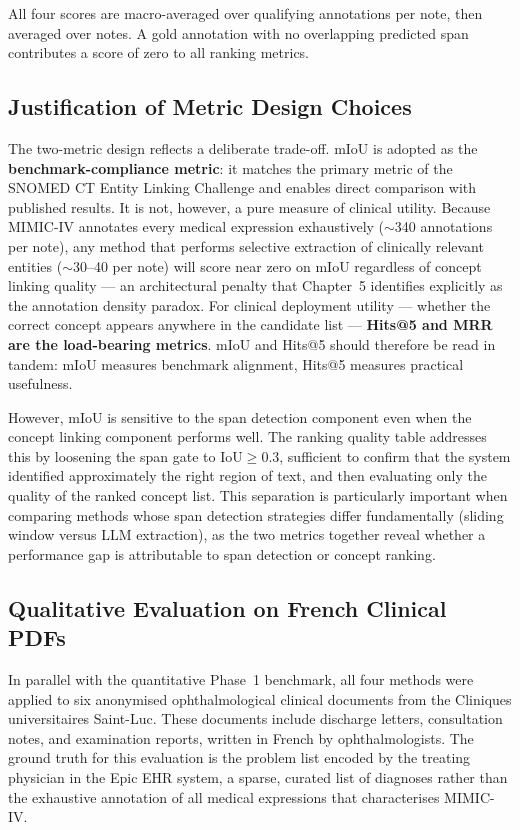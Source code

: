 All four scores are macro-averaged over qualifying annotations per note, then averaged over notes. A gold annotation with no overlapping predicted span contributes a score of zero to all ranking metrics.

\subsection{Justification of Metric Design Choices}

The two-metric design reflects a deliberate trade-off. mIoU is adopted as the \textbf{benchmark-compliance metric}: it matches the primary metric of the SNOMED CT Entity Linking Challenge and enables direct comparison with published results. It is not, however, a pure measure of clinical utility. Because MIMIC-IV annotates every medical expression exhaustively ($\sim$340 annotations per note), any method that performs selective extraction of clinically relevant entities ($\sim$30--40 per note) will score near zero on mIoU regardless of concept linking quality — an architectural penalty that Chapter~5 identifies explicitly as the annotation density paradox. For clinical deployment utility — whether the correct concept appears anywhere in the candidate list — \textbf{Hits@5 and MRR are the load-bearing metrics}. mIoU and Hits@5 should therefore be read in tandem: mIoU measures benchmark alignment, Hits@5 measures practical usefulness.

However, mIoU is sensitive to the span detection component even when the concept linking component performs well. The ranking quality table addresses this by loosening the span gate to $\text{IoU} \geq 0.3$, sufficient to confirm that the system identified approximately the right region of text, and then evaluating only the quality of the ranked concept list. This separation is particularly important when comparing methods whose span detection strategies differ fundamentally (sliding window versus LLM extraction), as the two metrics together reveal whether a performance gap is attributable to span detection or concept ranking.

\subsection{Qualitative Evaluation on French Clinical PDFs}

In parallel with the quantitative Phase~1 benchmark, all four methods were applied to six anonymised ophthalmological clinical documents from the Cliniques universitaires Saint-Luc. These documents include discharge letters, consultation notes, and examination reports, written in French by ophthalmologists. The ground truth for this evaluation is the problem list encoded by the treating physician in the Epic EHR system, a sparse, curated list of diagnoses rather than the exhaustive annotation of all medical expressions that characterises MIMIC-IV.

